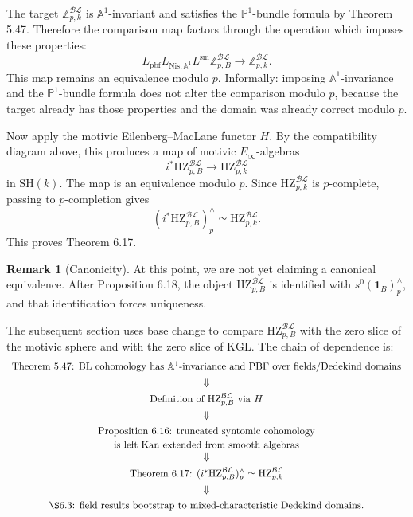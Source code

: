 \documentclass[11pt,a4paper]{article}
\newcommand{\Z}{\mathbb Z}
\newcommand{\Pone}{\mathbb P^1}
\newcommand{\Aone}{\mathbb A^1}
\newcommand{\SH}{\mathrm{SH}}
\newcommand{\Nis}{\mathrm{Nis}}
\newcommand{\BL}{\mathcal{BL}}
\newcommand{\pbf}{\mathrm{pbf}}
\newcommand{\KGL}{\mathrm{KGL}}
\newcommand{\HZ}{\mathrm{HZ}}
\newcommand{\1}{\mathbf 1}
\newcommand{\sm}{\mathrm{sm}}
\theoremstyle{bemstyle}
\theoremstyle{definition}
\newtheorem{remark}[theorem]{Remark}
\begin{document}
The target \(\Z^{\BL}_{p,k}\) is \(\Aone\)-invariant and satisfies the \(\Pone\)-bundle formula by Theorem 5.47. Therefore the comparison map factors through the operation which imposes these properties:
\[
  L_{\pbf}L_{\Nis,\Aone}L^{\sm}\Z^{\BL}_{p,B}
  \longrightarrow
  \Z^{\BL}_{p,k}.
\]
This map remains an equivalence modulo \(p\). Informally: imposing \(\Aone\)-invariance and the \(\Pone\)-bundle formula does not alter the comparison modulo \(p\), because the target already has those properties and the domain was already correct modulo \(p\).

Now apply the motivic Eilenberg--MacLane functor \(H\). By the compatibility diagram above, this produces a map of motivic \(E_\infty\)-algebras
\[
  i^*\HZ^{\BL}_{p,B}
  \longrightarrow
  \HZ^{\BL}_{p,k}
\]
in \(\SH(k)\). The map is an equivalence modulo \(p\). Since \(\HZ^{\BL}_{p,k}\) is \(p\)-complete, passing to \(p\)-completion gives
\[
  (i^*\HZ^{\BL}_{p,B})^\wedge_p\simeq \HZ^{\BL}_{p,k}.
\]
This proves Theorem 6.17.

\begin{remark}[Canonicity]
At this point, we are not yet claiming a canonical equivalence. After Proposition 6.18, the object \(\HZ^{\BL}_{p,B}\) is identified with \(s^0(\1_B)^\wedge_p\), and that identification forces uniqueness. 
\end{remark}

The subsequent section uses base change to compare \(\HZ^{\BL}_{p,B}\) with the zero slice of the motivic sphere and with the zero slice of \(\KGL\). The chain of dependence is:
\[
\begin{array}{c}
\text{Theorem 5.47: BL cohomology has }\Aone\text{-invariance and PBF over fields/Dedekind domains}\\[0.4em]
\Downarrow\\[0.4em]
\text{Definition of }\HZ^{\BL}_{p,B}\text{ via }H\\[0.4em]
\Downarrow\\[0.4em]
\begin{gathered}
\text{Proposition 6.16: truncated syntomic cohomology}\\[-0.1em]
\text{is left Kan extended from smooth algebras}
\end{gathered}\\[0.4em]
\Downarrow\\[0.4em]
\text{Theorem 6.17: }(i^*\HZ^{\BL}_{p,B})^\wedge_p\simeq \HZ^{\BL}_{p,k}\\[0.4em]
\Downarrow\\[0.4em]
\text{\S6.3: field results bootstrap to mixed-characteristic Dedekind domains.}
\end{array}
\]
\end{document}
